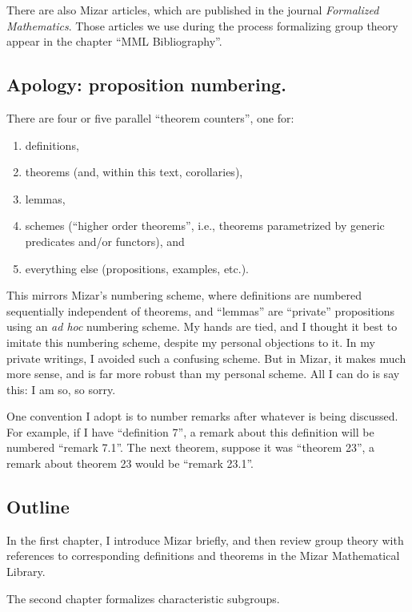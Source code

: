 There are also Mizar articles, which are published in the
journal \emph{Formalized Mathematics}. Those articles we use during the
process formalizing group theory appear in the chapter ``MML Bibliography''.

\subsection*{Apology: proposition numbering.} There are four or five parallel
``theorem counters'', one for:
\begin{enumerate}
\item definitions,
\item theorems (and, within this text, corollaries),
\item lemmas,
\item schemes (``higher order theorems'', i.e., theorems parametrized by
generic predicates and/or functors), and
\item everything else (propositions, examples, etc.).
\end{enumerate}
This mirrors Mizar's numbering scheme, where definitions are numbered
sequentially independent of theorems, and ``lemmas'' are ``private''
propositions using an \emph{ad hoc} numbering scheme. My hands are tied,
and I thought it best to imitate this numbering scheme, despite my
personal objections to it. In my private writings, I avoided such a
confusing scheme. But in Mizar, it makes much more sense, and is far
more robust than my personal scheme. All I can do is say this: I am so,
so sorry.

One convention I adopt is to number remarks after whatever is being
discussed. For example, if I have ``definition 7'', a remark about this
definition will be numbered ``remark 7.1''. The next theorem, suppose it
was ``theorem 23'', a remark about theorem 23 would be ``remark 23.1''.

\subsection*{Outline}
In the first chapter, I introduce Mizar briefly, and then review group
theory with references to corresponding definitions and theorems in the
Mizar Mathematical Library.

The second chapter formalizes characteristic subgroups.


